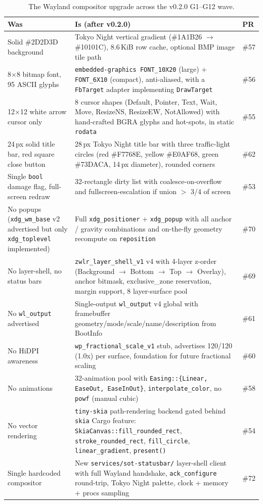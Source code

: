 \documentclass[11pt,a4paper]{article}
\begin{document}
\begin{table}[h]
\small
\centering
\begin{tabularx}{\textwidth}{lXl}
\toprule
\textbf{Was} & \textbf{Is (after v0.2.0)} & \textbf{PR} \\
\midrule
Solid \#2D2D3D background & Tokyo Night vertical gradient (\#1A1B26 $\to$ \#10101C), 8.6\,KiB row cache, optional BMP image tile path & \#57 \\
8$\times$8 bitmap font, 95 ASCII glyphs & \texttt{embedded-graphics FONT\_10X20} (large) + \texttt{FONT\_6X10} (compact), anti-aliased, with a \texttt{FbTarget} adapter implementing \texttt{DrawTarget} & \#56 \\
12$\times$12 white arrow cursor only & 8 cursor shapes (Default, Pointer, Text, Wait, Move, ResizeNS, ResizeEW, NotAllowed) with hand-crafted BGRA glyphs and hot-spots, in static \texttt{rodata} & \#55 \\
24\,px solid title bar, red square close button & 28\,px Tokyo Night title bar with three traffic-light circles (red \#F7768E, yellow \#E0AF68, green \#73DACA, 14\,px diameter), rounded corners & \#62 \\
Single \texttt{bool} damage flag, full-screen redraw & 32-rectangle dirty list with coalesce-on-overflow and fullscreen-escalation if union $>$ 3/4 of screen & \#53 \\
No popups (\texttt{xdg\_wm\_base} v2 advertised but only \texttt{xdg\_toplevel} implemented) & Full \texttt{xdg\_positioner} + \texttt{xdg\_popup} with all anchor / gravity combinations and on-the-fly geometry recompute on \texttt{reposition} & \#70 \\
No layer-shell, no status bars & \texttt{zwlr\_layer\_shell\_v1} v4 with 4-layer z-order (Background $\to$ Bottom $\to$ Top $\to$ Overlay), anchor bitmask, exclusive\_zone reservation, margin support, 8 layer-surface pool & \#69 \\
No \texttt{wl\_output} advertised & Single-output \texttt{wl\_output} v4 global with framebuffer geometry/mode/scale/name/description from BootInfo & \#61 \\
No HiDPI awareness & \texttt{wp\_fractional\_scale\_v1} stub, advertises 120/120 (1.0x) per surface, foundation for future fractional scaling & \#60 \\
No animations & 32-animation pool with \texttt{Easing::\{Linear, EaseOut, EaseInOut\}}, \texttt{interpolate\_color}, no \texttt{powf} (manual cubic) & \#58 \\
No vector rendering & \texttt{tiny-skia} path-rendering backend gated behind \texttt{skia} Cargo feature: \texttt{SkiaCanvas::fill\_rounded\_rect}, \texttt{stroke\_rounded\_rect}, \texttt{fill\_circle}, \texttt{linear\_gradient}, \texttt{present()} & \#54 \\
Single hardcoded compositor & New \texttt{services/sot-statusbar/} layer-shell client with full Wayland handshake, \texttt{ack\_configure} round-trip, Tokyo Night palette, clock + memory + procs sampling & \#72 \\
\bottomrule
\end{tabularx}
\caption{The Wayland compositor upgrade across the v0.2.0 G1--G12 wave.}
\end{table}
\end{document}
